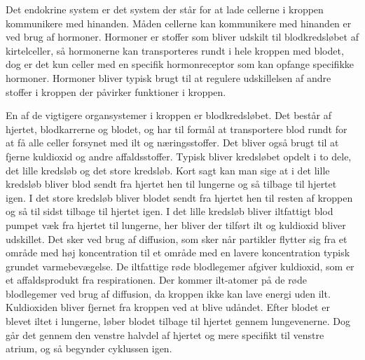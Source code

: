 Det endokrine system er det system der står for at lade cellerne i kroppen kommunikere med hinanden. Måden cellerne kan kommunikere med hinanden er ved brug af hormoner. Hormoner er stoffer som bliver udskilt til blodkredsløbet af kirtelceller, så hormonerne kan transporteres rundt i hele kroppen med blodet, dog er det kun celler med en specifik hormonreceptor som kan opfange specifikke hormoner. Hormoner bliver typisk brugt til at regulere udskillelsen af andre stoffer i kroppen der påvirker funktioner i kroppen. 

En af de vigtigere organsystemer i kroppen er blodkredsløbet. Det består af hjertet, blodkarrerne og blodet, og har til formål at transportere blod rundt for at få alle celler forsynet med ilt og næringsstoffer. Det bliver også brugt til at fjerne kuldioxid og andre affaldsstoffer. Typisk bliver kredsløbet opdelt i to dele, det lille kredsløb og det store kredsløb. Kort sagt kan man sige at i det lille kredsløb bliver blod sendt fra hjertet hen til lungerne og så tilbage til hjertet igen. I det store kredsløb bliver blodet sendt fra hjertet hen til resten af kroppen og så til sidst tilbage til hjertet igen.
I det lille kredsløb bliver iltfattigt blod pumpet væk fra hjertet til lungerne, her bliver der tilført ilt og kuldioxid bliver udskillet. Det sker ved brug af diffusion, som sker når partikler flytter sig fra et område med høj koncentration til et område med en lavere koncentration typisk grundet varmebevægelse. De iltfattige røde blodlegemer afgiver kuldioxid, som er et affaldsprodukt fra respirationen. Der kommer ilt-atomer på de røde blodlegemer ved brug af diffusion, da kroppen ikke kan lave energi uden ilt. Kuldioxiden bliver fjernet fra kroppen ved at blive udåndet. Efter blodet er blevet iltet i lungerne, løber blodet tilbage til hjertet gennem lungevenerne. Dog går det gennem den venstre halvdel af hjertet og mere specifikt til venstre atrium, og så begynder cyklussen igen. 
 
